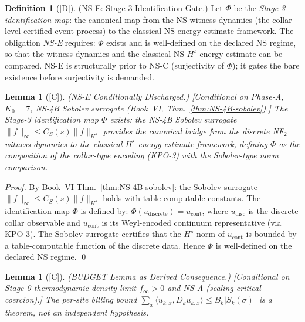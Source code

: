 \documentclass[12pt,oneside]{amsbook}
\theoremstyle{plain}
\newtheorem{lemma}[theorem]{Lemma}
\theoremstyle{definition}
\newtheorem{definition}[theorem]{Definition}
\theoremstyle{remark}
\newcommand{\status}[1]{\textup{[#1]}}
\begin{document}

\begin{definition}[\status{D}]\label{def:NS-E}
\textup{(NS-E: Stage-3 Identification Gate.)}
Let $\Phi$ be the \emph{Stage-3 identification map}: the canonical
map from the NS witness dynamics (the collar-level certified event
process) to the classical NS energy-estimate framework.
The obligation \emph{NS-E} requires:
$\Phi$ exists and is well-defined on the declared NS regime,
so that the witness dynamics and the classical NS $H^s$ energy
estimate can be compared. NS-E is structurally prior to NS-C
(surjectivity of $\Phi$); it gates the bare existence before
surjectivity is demanded.
\end{definition}

\begin{lemma}[\status{C}]\label{lem:NS-E-discharged}
\textup{(NS-E Conditionally Discharged.)}
\textup{[Conditional on Phase-A, $K_0=7$, NS-4B Sobolev surrogate
(Book~VI, Thm.~\ref{thm:NS-4B-sobolev}).]}
The Stage-3 identification map $\Phi$ exists: the NS-4B Sobolev
surrogate $\|f\|_\infty \leq C_S(s)\|f\|_{H^s}$ provides the
canonical bridge from the discrete NF$_2$ witness dynamics to the
classical $H^s$ energy estimate framework, defining $\Phi$ as the
composition of the collar-type encoding (KPO-3) with the
Sobolev-type norm comparison.
\end{lemma}

\begin{proof}
By Book~VI Thm.~\ref{thm:NS-4B-sobolev}: the Sobolev surrogate
$\|f\|_\infty \leq C_S(s)\|f\|_{H^s}$ holds with table-computable
constants. The identification map $\Phi$ is defined by:
$\Phi(u_{\mathrm{discrete}}) = u_{\mathrm{cont}}$, where
$u_{\mathrm{disc}}$ is the discrete collar observable and
$u_{\mathrm{cont}}$ is its Weyl-encoded continuum representative
(via KPO-3). The Sobolev surrogate certifies that the
$H^s$-norm of $u_{\mathrm{cont}}$ is bounded by a table-computable
function of the discrete data. Hence $\Phi$ is well-defined on the
declared NS regime. \qed
\end{proof}

\begin{lemma}[\status{C}]\label{lem:BUDGET}
\textup{(BUDGET Lemma as Derived Consequence.)}
\textup{[Conditional on Stage-0 thermodynamic density limit
$f_\infty > 0$ and NS-A (scaling-critical coercion).]}
The per-site billing bound
$\sum_x \langle u_{k,x}, D_k u_{k,x}\rangle \leq B_k |S_k(\sigma)|$
is a \emph{theorem}, not an independent hypothesis.
\end{lemma}
\end{document}
